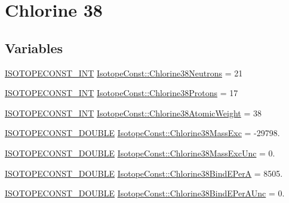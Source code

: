 \hypertarget{group___isotope_const-_chlorine-_cl38}{}\section{Chlorine 38}
\label{group___isotope_const-_chlorine-_cl38}
\subsection*{Variables}
\begin{DoxyCompactItemize}
\item 
\mbox{\hyperlink{group___isotope_const-_macros_ga5f18360b3e99483a35c32d789e62621c}{I\+S\+O\+T\+O\+P\+E\+C\+O\+N\+S\+T\+\_\+\+I\+NT}} \mbox{\hyperlink{group___isotope_const-_chlorine-_cl38_ga9e25cf3dd8fffe4f0739d4a27b179063}{Isotope\+Const\+::\+Chlorine38\+Neutrons}} = 21
\item 
\mbox{\hyperlink{group___isotope_const-_macros_ga5f18360b3e99483a35c32d789e62621c}{I\+S\+O\+T\+O\+P\+E\+C\+O\+N\+S\+T\+\_\+\+I\+NT}} \mbox{\hyperlink{group___isotope_const-_chlorine-_cl38_gad76c2fd2ee6caf5a2a3b189921626380}{Isotope\+Const\+::\+Chlorine38\+Protons}} = 17
\item 
\mbox{\hyperlink{group___isotope_const-_macros_ga5f18360b3e99483a35c32d789e62621c}{I\+S\+O\+T\+O\+P\+E\+C\+O\+N\+S\+T\+\_\+\+I\+NT}} \mbox{\hyperlink{group___isotope_const-_chlorine-_cl38_ga256c0b755596f68913fc60b9ac8f3b21}{Isotope\+Const\+::\+Chlorine38\+Atomic\+Weight}} = 38
\item 
\mbox{\hyperlink{group___isotope_const-_macros_ga8f45a7272ce02c0b4c65c44636ed719a}{I\+S\+O\+T\+O\+P\+E\+C\+O\+N\+S\+T\+\_\+\+D\+O\+U\+B\+LE}} \mbox{\hyperlink{group___isotope_const-_chlorine-_cl38_ga354cdfddb57d8a9095fd3b25994b74e7}{Isotope\+Const\+::\+Chlorine38\+Mass\+Exc}} = -\/29798.
\item 
\mbox{\hyperlink{group___isotope_const-_macros_ga8f45a7272ce02c0b4c65c44636ed719a}{I\+S\+O\+T\+O\+P\+E\+C\+O\+N\+S\+T\+\_\+\+D\+O\+U\+B\+LE}} \mbox{\hyperlink{group___isotope_const-_chlorine-_cl38_gacf5129ea30dccfde98b2835409866f39}{Isotope\+Const\+::\+Chlorine38\+Mass\+Exc\+Unc}} = 0.
\item 
\mbox{\hyperlink{group___isotope_const-_macros_ga8f45a7272ce02c0b4c65c44636ed719a}{I\+S\+O\+T\+O\+P\+E\+C\+O\+N\+S\+T\+\_\+\+D\+O\+U\+B\+LE}} \mbox{\hyperlink{group___isotope_const-_chlorine-_cl38_ga0526efd64b7d51007ffe785e3aad86a9}{Isotope\+Const\+::\+Chlorine38\+Bind\+E\+PerA}} = 8505.
\item 
\mbox{\hyperlink{group___isotope_const-_macros_ga8f45a7272ce02c0b4c65c44636ed719a}{I\+S\+O\+T\+O\+P\+E\+C\+O\+N\+S\+T\+\_\+\+D\+O\+U\+B\+LE}} \mbox{\hyperlink{group___isotope_const-_chlorine-_cl38_ga5e9764bf16a36bf23b9b8ca4a99e3e37}{Isotope\+Const\+::\+Chlorine38\+Bind\+E\+Per\+A\+Unc}} = 0.

\end{DoxyCompactItemize}
